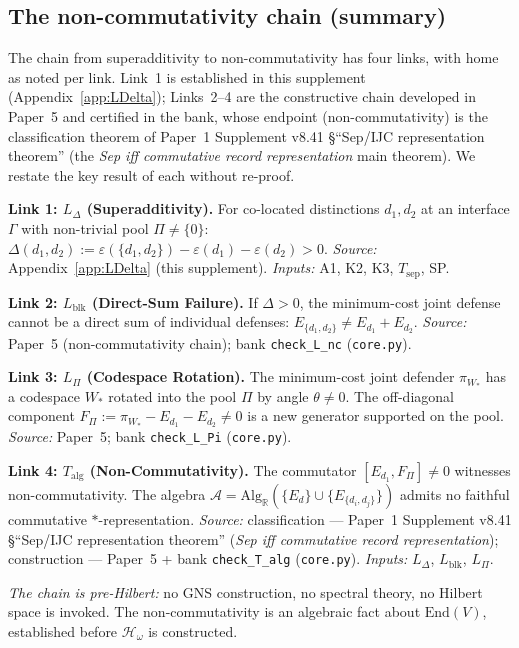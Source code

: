 \documentclass[11pt]{article}
\theoremstyle{definition}
\newcommand{\eps}{\varepsilon}
\newcommand{\End}{\mathrm{End}}
\begin{document}
\subsection{The non-commutativity chain (summary)}
\label{sec:nc_summary}

The chain from superadditivity to non-commutativity has four links,
with home as noted per link.  Link~1 is established in this supplement
(Appendix~\ref{app:LDelta}); Links~2--4 are the constructive chain
developed in Paper~5 and certified in the bank, whose endpoint
(non-commutativity) is the classification theorem of Paper~1 Supplement
v8.41 \S``Sep/IJC representation theorem'' (the \emph{Sep iff commutative
record representation} main theorem).  We restate the key result
of each without re-proof.

\smallskip\noindent\textbf{Link 1: $L_\Delta$ (Superadditivity).}
For co-located distinctions $d_1, d_2$ at an interface $\Gamma$ with
non-trivial pool $\Pi \ne \{0\}$:
$\Delta(d_1, d_2) := \eps(\{d_1, d_2\}) - \eps(d_1) - \eps(d_2) > 0$.
\textit{Source:} Appendix~\ref{app:LDelta} (this supplement).  \textit{Inputs:} A1, K2, K3,
$T_{\mathrm{sep}}$, SP.

\smallskip\noindent\textbf{Link 2: $L_{\mathrm{blk}}$ (Direct-Sum Failure).}
If $\Delta > 0$, the minimum-cost joint defense cannot be a direct sum
of individual defenses: $E_{\{d_1,d_2\}} \ne E_{d_1} + E_{d_2}$.
\textit{Source:} Paper~5 (non-commutativity chain); bank \texttt{check\_L\_nc} (\texttt{core.py}).

\smallskip\noindent\textbf{Link 3: $L_\Pi$ (Codespace Rotation).}
The minimum-cost joint defender $\pi_{W_*}$ has a codespace $W_*$ rotated
into the pool $\Pi$ by angle $\theta \ne 0$.  The off-diagonal component
$F_\Pi := \pi_{W_*} - E_{d_1} - E_{d_2} \ne 0$ is a new generator
supported on the pool.
\textit{Source:} Paper~5; bank \texttt{check\_L\_Pi} (\texttt{core.py}).

\smallskip\noindent\textbf{Link 4: $T_{\mathrm{alg}}$ (Non-Commutativity).}
The commutator $[E_{d_1}, F_\Pi] \ne 0$ witnesses non-commutativity.
The algebra $\mathcal{A} = \mathrm{Alg}_\mathbb{R}(\{E_d\} \cup
\{E_{\{d_i,d_j\}}\})$ admits no faithful commutative
$*$-representation.
\textit{Source:} classification --- Paper~1 Supplement v8.41
\S``Sep/IJC representation theorem'' (\emph{Sep iff commutative record
representation}); construction --- Paper~5 + bank \texttt{check\_T\_alg}
(\texttt{core.py}).  \textit{Inputs:} $L_\Delta$,
$L_{\mathrm{blk}}$, $L_\Pi$.

\smallskip\noindent\textit{The chain is pre-Hilbert:} no GNS
construction, no spectral theory, no Hilbert space is invoked.
The non-commutativity is an algebraic fact about $\End(V)$,
established before $\mathcal{H}_\omega$ is constructed.
\end{document}
